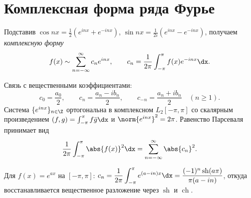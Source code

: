 \section{Комплексная форма ряда Фурье}

\begin{definition}
Подставив $\cos nx=\tfrac12(e^{inx}+e^{-inx})$, $\sin nx=\tfrac1{2i}(e^{inx}-e^{-inx})$, получаем
\emph{комплексную форму}
\[
  f(x)\sim\sum_{n=-\infty}^{\infty}c_n e^{inx},\qquad
  c_n=\frac1{2\pi}\int_{-\pi}^{\pi}f(x)e^{-inx}\dx .
\]
\end{definition}

Связь с вещественными коэффициентами:
\[
  c_0=\frac{a_0}{2},\qquad c_n=\frac{a_n-ib_n}{2},\qquad c_{-n}=\frac{a_n+ib_n}{2}\quad(n\ge1).
\]
Система $\{e^{inx}\}_{n\in\Z}$ ортогональна в комплексном $L_2[-\pi,\pi]$ со скалярным
произведением $(f,g)=\int_{-\pi}^{\pi}f\bar g\dx$ и $\norm{e^{inx}}^2=2\pi$. Равенство Парсеваля
принимает вид
\[
  \frac1{2\pi}\int_{-\pi}^{\pi}\abs{f(x)}^2\dx=\sum_{n=-\infty}^{\infty}\abs{c_n}^2 .
\]

\begin{example}
Для $f(x)=e^{ax}$ на $[-\pi,\pi]$:
$\displaystyle c_n=\frac1{2\pi}\int_{-\pi}^{\pi}e^{(a-in)x}\dx
=\frac{(-1)^n\operatorname{sh}(a\pi)}{\pi(a-in)}$, откуда восстанавливается вещественное
разложение через $\operatorname{sh}$ и $\operatorname{ch}$.
\end{example}

